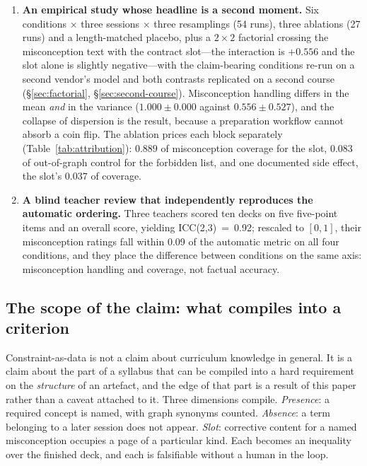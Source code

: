 \documentclass[review,12pt]{elsarticle}
\renewcommand{\_}{\kgunderscore\allowbreak}
\begin{document}
\begin{enumerate}
  \item \textbf{An empirical study whose headline is a second moment.} Six
  conditions $\times$ three sessions $\times$ three resamplings (54 runs), three
  ablations (27 runs) and a length-matched placebo, plus a $2\times2$ factorial
  crossing the misconception text with the contract slot---the interaction is
  $+0.556$ and the slot alone is slightly negative---with the claim-bearing
  conditions re-run on a second vendor's model and both contrasts replicated on
  a second course (\S\ref{sec:factorial}, \S\ref{sec:second-course}).
  Misconception handling differs in the mean \emph{and} in the variance
  ($1.000 \pm 0.000$ against $0.556 \pm 0.527$), and the collapse of dispersion
  is the result, because a preparation workflow cannot absorb a coin flip. The
  ablation prices each block separately (Table~\ref{tab:attribution}): $0.889$
  of misconception coverage for the slot, $0.083$ of out-of-graph control for
  the forbidden list, and one documented side effect, the slot's $0.037$ of
  coverage.

  \item \textbf{A blind teacher review that independently reproduces the
  automatic ordering.} Three teachers scored ten decks on five five-point items
  and an overall score, yielding ICC(2,3)~=~0.92; rescaled to $[0,1]$, their
  misconception ratings fall within 0.09 of the automatic metric on all four
  conditions, and they place the difference between conditions on the same axis:
  misconception handling and coverage, not factual accuracy.
\end{enumerate}

\subsection{The scope of the claim: what compiles into a criterion}
\label{sec:boundary}

Constraint-as-data is not a claim about curriculum knowledge in general. It is a
claim about the part of a syllabus that can be compiled into a hard requirement on
the \emph{structure} of an artefact, and the edge of that part is a result of this
paper rather than a caveat attached to it. Three dimensions compile.
\emph{Presence}: a required concept is named, with graph synonyms counted.
\emph{Absence}: a term belonging to a later session does not appear.
\emph{Slot}: corrective content for a named misconception occupies a page of a
particular kind. Each becomes an inequality over the finished deck, and each is
falsifiable without a human in the loop.
\end{document}
